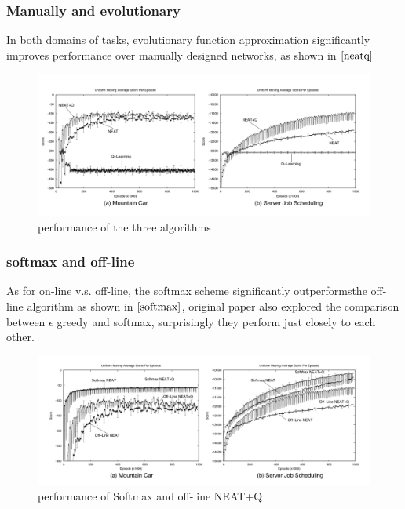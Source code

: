 \documentclass{article}
\begin{document}
\subsubsection{Manually and evolutionary}
In both domains of tasks, evolutionary function approximation significantly improves performance over manually designed networks, as shown in $\ref{neatq}$
\begin{figure}[htbp]
  \includegraphics[width = \textwidth]{3result}
  \caption{performance of the three algorithms}
  \label{neatq}
 \end{figure}


\subsubsection{softmax and off-line}
As for on-line v.s. off-line, the softmax scheme significantly outperformsthe off-line algorithm as shown in $\ref{softmax}$, original paper also 
explored the comparison between $\epsilon$ greedy and softmax, surprisingly they perform just closely to each other.
\begin{figure}[htbp]
  \includegraphics[width = \textwidth]{explorationneat}
  \caption{performance of Softmax and off-line NEAT+Q}
  \label{softmax}
 \end{figure}
\end{document}
